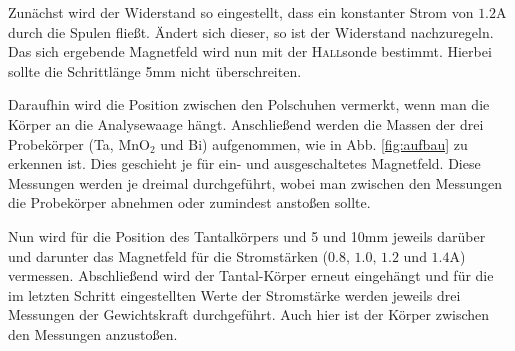 \documentclass[12pt,a4paper,titlepage,headinclude,bibtotoc]{scrartcl}
\begin{document}
Zunächst wird der Widerstand so eingestellt, dass ein konstanter Strom von $1.2\si\ampere$ durch die Spulen fließt.
Ändert sich dieser, so ist der Widerstand nachzuregeln.
Das sich ergebende Magnetfeld wird nun mit der \textsc{Hall}sonde bestimmt.
Hierbei sollte die Schrittlänge 5mm nicht überschreiten.

Daraufhin wird die Position zwischen den Polschuhen vermerkt, wenn man die Körper an die Analysewaage hängt.
Anschließend werden die Massen der drei Probekörper (Ta, MnO$_2$ und Bi) aufgenommen, wie in Abb. \ref{fig:aufbau} zu erkennen ist.
Dies geschieht je für ein- und ausgeschaltetes Magnetfeld.
Diese Messungen werden je dreimal durchgeführt, wobei man zwischen den Messungen die Probekörper abnehmen oder zumindest anstoßen sollte.

Nun wird für die Position des Tantalkörpers und 5 und 10mm jeweils darüber und darunter das Magnetfeld für die Stromstärken ($0.8,\,1.0,\,1.2\text{ und }1.4\si\ampere$) vermessen.
Abschließend wird der Tantal-Körper erneut eingehängt und für die im letzten Schritt eingestellten Werte der Stromstärke werden jeweils drei Messungen der Gewichtskraft durchgeführt.
Auch hier ist der Körper zwischen den Messungen anzustoßen.
\end{document}
